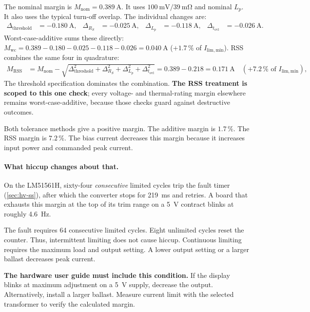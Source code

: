 The nominal margin is $M_{\mathrm{nom}}=\SI{0.389}{\ampere}$. It uses
$\SI{100}{\milli\volt}/\SI{39}{\milli\ohm}$ and nominal $L_p$. It also uses
the typical turn-off overlap. The individual changes are:
\begin{align*}
  \Delta_{\mathrm{threshold}} &= \SI{-0.180}{\ampere}, &
  \Delta_{R_S} &= \SI{-0.025}{\ampere}, &
  \Delta_{L_p} &= \SI{-0.118}{\ampere}, &
  \Delta_{t_{\mathrm{ovl}}} &= \SI{-0.026}{\ampere}.
\end{align*}
Worst-case-additive sums these directly: $M_{\mathrm{wc}} = 0.389 - 0.180 - 0.025
- 0.118 - 0.026 = \SI{+0.040}{\ampere}$ ($+1.7\,\%$ of $I_{\mathrm{lim,min}}$).
RSS combines the same four in quadrature:
\begin{align*}
  M_{\mathrm{RSS}} &= M_{\mathrm{nom}} - \sqrt{\Delta_{\mathrm{threshold}}^2 +
    \Delta_{R_S}^2 + \Delta_{L_p}^2 + \Delta_{t_{\mathrm{ovl}}}^2}
    = 0.389 - 0.218 = \SI{+0.171}{\ampere}
    \quad (+7.2\,\% \text{ of } I_{\mathrm{lim,min}}),
\end{align*}
The threshold specification dominates the combination. \textbf{The RSS treatment
is scoped to this one check}; every voltage- and thermal-rating margin elsewhere
remains worst-case-additive, because those checks guard against destructive
outcomes.

Both tolerance methods give a positive margin. The additive margin is
$1.7\,\%$. The RSS margin is $7.2\,\%$. The bias current decreases this margin
because it increases input power and commanded peak current.

\paragraph{What hiccup changes about that.}\label{sec:hv-cs-hiccup}
On the LM51561H, sixty-four \emph{consecutive} limited cycles trip the fault
timer (\cref{sec:hv-ss}), after which the converter stops for
\SI{219}{\milli\second} and retries. A board that exhausts this margin at the
top of its trim range on a \SI{5}{\volt} contract blinks at roughly
\SI{4.6}{\hertz}.

The fault requires 64 consecutive limited cycles. Eight unlimited cycles reset
the counter. Thus, intermittent limiting does not cause hiccup. Continuous
limiting requires the maximum load and output setting. A lower output setting
or a larger ballast decreases peak current.

\textbf{The hardware user guide must include this condition.} If the display
blinks at maximum adjustment on a \SI{5}{\volt} supply, decrease the output.
Alternatively, install a larger ballast. Measure current limit with the
selected transformer to verify the calculated margin.

